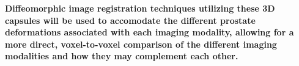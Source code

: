 \textbf{Diffeomorphic image registration techniques utilizing these 3D capsules
will be used to accomodate the different prostate deformations associated with
each imaging modality, allowing for a more direct, voxel-to-voxel comparison of
the different imaging modalities and how they may complement each other.}
